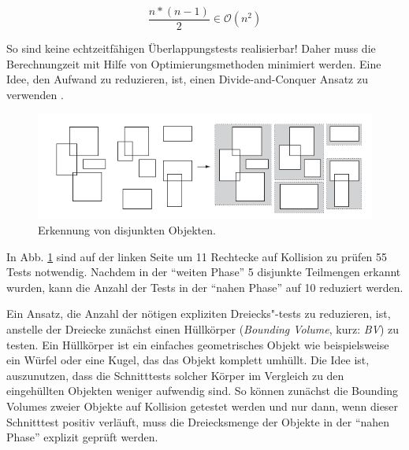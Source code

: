 \begin{equation}
\frac{n*(n-1)}{2} \in \mathcal O(n^2)\label{quad}
\end{equation}

So sind keine echtzeitf\"ahigen \"Uberlappungstests realisierbar! Daher muss die
Berechnungzeit mit Hilfe von Optimierungsmethoden minimiert werden. Eine Idee,
den Aufwand zu reduzieren, ist, einen Divide-and-Conquer Ansatz zu verwenden \cite{Ericson05}. 


\begin{figure}[H]
\centerline{
	\includegraphics[width=0.7\columnwidth]{graphics/box.png}
}
\caption{Erkennung von disjunkten Objekten.}
\label{broadbox}
\end{figure}

In Abb. \ref{broadbox} sind auf der linken Seite um 11 Rechtecke auf Kollision zu pr\"ufen 55 Tests notwendig.
Nachdem in der "`weiten Phase"' 5 disjunkte Teilmengen erkannt wurden, kann die Anzahl der Tests in der "`nahen Phase"' auf 10 reduziert werden.

Ein Ansatz, die Anzahl der n\"otigen expliziten Dreiecks"-tests zu reduzieren, ist, anstelle der Dreiecke zun\"achst einen H\"ullk\"orper ({\em Bounding Volume}, kurz: {\em BV}) zu testen. Ein  H\"ullk\"orper ist ein
einfaches geometrisches Objekt wie beispielsweise ein W\"urfel oder eine Kugel, das das Objekt komplett
umh\"ullt. Die Idee ist, auszunutzen, dass die Schnitttests solcher K\"orper im Vergleich zu den eingeh\"ullten Objekten weniger aufwendig sind. So k\"onnen zun\"achst die Bounding Volumes zweier Objekte auf Kollision
getest\-et werden und nur dann, wenn dieser Schnitttest positiv verl\"auft, muss
die Dreiecksmenge der Objekte in der "`nahen Phase"' explizit gepr\"uft werden.

